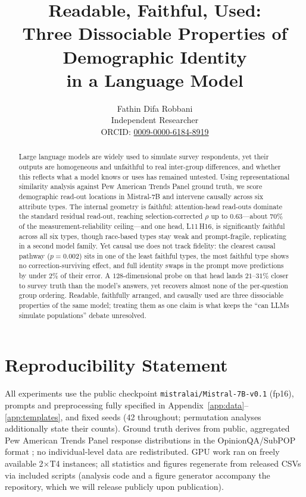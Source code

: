 \documentclass[11pt]{article}
\title{Readable, Faithful, Used:\\
Three Dissociable Properties of Demographic Identity\\
in a Language Model}
\author{Fathin Difa Robbani\\
Independent Researcher\\
\small ORCID: \href{https://orcid.org/0009-0000-6184-8919}{0009-0000-6184-8919}}
\date{}
\newcommand{\rrho}{\rho}
\newcommand{\starhead}{L11\,H16}
\begin{document}
\maketitle

\begin{abstract}
Large language models are widely used to simulate survey respondents, yet
their outputs are homogeneous and unfaithful to real inter-group
differences, and whether this reflects what a model knows or uses has
remained untested. Using representational similarity analysis against Pew
American Trends Panel ground truth, we score demographic read-out
locations in Mistral-7B and intervene causally across six attribute
types. The internal geometry is faithful: attention-head read-outs
dominate the standard residual read-out, reaching selection-corrected
$\rrho$ up to $0.63$---about $70\%$ of the measurement-reliability
ceiling---and one head, \starhead, is significantly faithful across all
six types, though race-based types stay weak and prompt-fragile,
replicating in a second model family. Yet causal use does not track
fidelity: the clearest causal pathway ($p=0.002$) sits in one of the
least faithful types, the most faithful type shows no
correction-surviving effect, and full identity swaps in the prompt move
predictions by under $2\%$ of their error. A $128$-dimensional probe on
that head lands $21$--$31\%$ closer to survey truth than the model's
answers, yet recovers almost none of the per-question group ordering.
Readable, faithfully arranged, and causally used are three dissociable
properties of the same model; treating them as one claim is what keeps
the ``can LLMs simulate populations'' debate unresolved.
\end{abstract}










\section*{Reproducibility Statement}
All experiments use the public checkpoint \texttt{mistralai/Mistral-7B-v0.1}
(fp16), prompts and preprocessing fully specified in
Appendix~\ref{app:data}--\ref{app:templates}, and fixed seeds (42
throughout; permutation analyses additionally state their counts).
Ground truth derives from public, aggregated Pew American Trends Panel
response distributions in the OpinionQA/SubPOP format
\citep{opinionqa2023, subpop2025}; no individual-level data are
redistributed. GPU work ran on freely available 2$\times$T4 instances;
all statistics and figures regenerate from released CSVs via included
scripts (analysis code and a figure generator accompany the repository,
which we will release publicly upon publication).




\appendix

\end{document}
